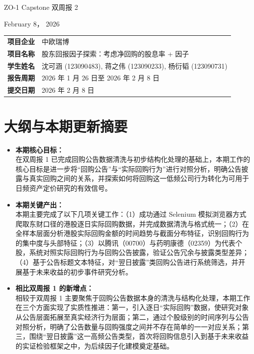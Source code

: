 \documentclass[a4paper,10pt]{article}
\begin{document}
\begin{center}
    \vspace*{1cm}
    {\Huge ZO-1 Capstone 双周报 2}
    
    \vspace{2.2cm}
    {\Large February 8， 2026}
    
    \vspace{1.2cm}
    \renewcommand{\arraystretch}{1.5}
    \begin{tabular}{@{} >{\bfseries}l l @{}}
        \toprule[1.5pt]
        项目企业 & 中欧瑞博 \\
        项目名称 & 股东回报因子探索：考虑净回购的股息率 + 因子 \\
        学生姓名 & 沈可涵 (123090483), 蒋之伟 (123090233), 杨衍韬 (123090731) \\
        报告周期 & 2026 年 1 月 26 日至 2026 年 2 月 8 日 \\
        提交日期 & 2026 年 2 月 8 日 \\
        \bottomrule[1.5pt]
    \end{tabular}
\end{center}

\newpage
\tableofcontents
\newpage


\section{大纲与本期更新摘要}

\begin{itemize}
    \item \textbf{本期核心目标：}\\
    在双周报 1 已完成回购公告数据清洗与初步结构化处理的基础上，本期工作的核心目标是进一步将“回购公告”与“实际回购行为”进行对照分析，明确公告披露与真实回购之间的关系，并探索如何将回购这一低频公司行为转化为可用于日频资产定价研究的有效信号。

    \item \textbf{本期关键产出：}\\
    本期主要完成了以下几项关键工作：（1）成功通过 Selenium 模拟浏览器方式爬取东财口径的港股逐日实际回购数据，并完成数据清洗与格式统一；（2）在全样本层面分析港股实际回购金额的时间趋势与截面分布特征，识别回购行为的集中度与头部特征；（3）以腾讯（00700）与药明康德（02359）为代表个股，系统对照实际回购行为与回购公告披露，验证公告冗余与披露类型差异；（4）基于公告标题文本特征，对“翌日披露”类回购公告进行系统筛选，并开展基于未来收益的初步事件研究分析。

    \item \textbf{相比双周报 1 的新增点：}\\
    相较于双周报 1 主要聚焦于回购公告数据本身的清洗与结构化处理，本期工作在三个方面实现了实质性推进：第一，引入逐日“实际回购”数据，使研究对象从公告层面拓展至真实经济行为层面；第二，通过个股级别的时间序列与公告对照分析，明确了公告数量与回购强度之间并不存在简单的一一对应关系；第三，围绕“翌日披露”这一高频公告类型，首次将回购信息引入到基于未来收益的实证检验框架之中，为后续因子化建模奠定基础。
\end{itemize}
\end{document}
